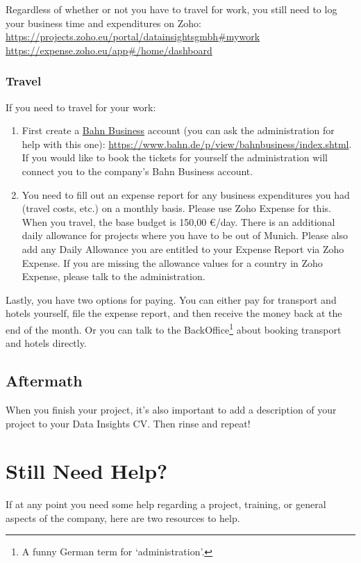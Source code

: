 \documentclass[11pt]{report}
\begin{document}
Regardless of whether or not you have to travel for work, you still need to log your business time and expenditures on Zoho:
\\\href{https://projects.zoho.eu/portal/datainsightsgmbh#mywork}{https://projects.zoho.eu/portal/datainsightsgmbh\#mywork}\\
\href{https://expense.zoho.eu/app#/home/dashboard}{https://expense.zoho.eu/app\#/home/dashboard}\\

\subsubsection{Travel}
If you need to travel for your work:
\begin{enumerate}
\item First create a \underline{Bahn Business} account (you can ask the administration for help with this one):
\href {https://www.bahn.de/p/view/bahnbusiness/index.shtml}{\scriptsize https://www.bahn.de/p/view/bahnbusiness/index.shtml}.\\
If you would like to book the tickets for yourself the administration will connect you to the company's Bahn Business account. 
\item You need to fill out an expense report for any business expenditures you had (travel costs, etc.) on a monthly basis. Please use Zoho Expense for this.
When you travel, the base budget is 150,00 \euro/day. There is an additional daily allowance for projects where you have to be out of Munich. Please also add any Daily Allowance you are entitled to your Expense Report via Zoho Expense.
If you are missing the allowance values for a country in Zoho Expense, please talk to the administration.
\end{enumerate}

Lastly, you have two options for paying. You can either pay for transport and hotels yourself, file the expense report, and then receive the money back at the end of the month. Or you can talk to the BackOffice\footnote{A funny German term for `administration'.} about booking transport and hotels directly.

\subsection{Aftermath}
When you finish your project, it's also important to add a description of your project to your Data Insights CV. Then rinse and repeat!

\section{Still Need Help?}
\label{help}
If at any point you need some help regarding a project, training, or general aspects of the company, here are two resources to help.
\end{document}
